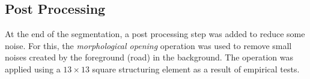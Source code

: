 \subsection{Post Processing}
\label{cap6_pos_processamento}

At the end of the segmentation, a post processing step was added to reduce some noise.
For this, the \textit{morphological opening} operation was used to remove small noises created by the foreground (road) in the background.
The operation was applied using a $13 \times 13$ square structuring element as a result of empirical tests.

% 

